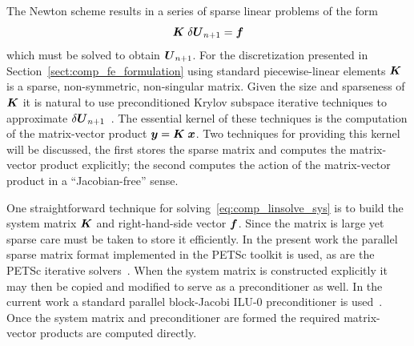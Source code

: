 The Newton scheme results in a series of sparse linear problems of the form
\begin{equation}
  {\boldsymbol{K}}\;\delta{\boldsymbol{U}}_{n+1}={\boldsymbol{f}}
  \label{eq:comp_linsolve_sys}
\end{equation}
which must be solved to obtain ${\boldsymbol{U}}_{n+1}$.  For the discretization presented in Section~\ref{sect:comp_fe_formulation} using standard piecewise-linear elements ${\boldsymbol{K}}$ is a sparse, non-symmetric, non-singular matrix.  Given the size and sparseness of ${\boldsymbol{K}}$ it is natural to use preconditioned Krylov subspace iterative techniques to approximate $\delta{\boldsymbol{U}}_{n+1}$~\cite{barrett94templates,golub_van_loan}.  The essential kernel of these techniques is the computation of the matrix-vector product ${\boldsymbol{y}}={\boldsymbol{K}}\;{\boldsymbol{x}}$.  Two techniques for providing this kernel will be discussed, the first stores the sparse matrix and computes the matrix-vector product explicitly; the second computes the action of the matrix-vector product in a ``Jacobian-free'' sense.

One straightforward technique for solving~\eqref{eq:comp_linsolve_sys} is to build the system matrix ${\boldsymbol{K}}$ and right-hand-side vector ${\boldsymbol{f}}$.  Since the matrix is large yet sparse care must be taken to store it efficiently.  In the present work the parallel sparse matrix format implemented in the PETSc toolkit is used, as are the PETSc iterative solvers~\cite{petsc_manual}.  When the system matrix is constructed explicitly it may then be copied and modified to serve as a preconditioner as well.  In the current work a standard parallel block-Jacobi ILU-0 preconditioner is used~\cite{barrett94templates,golub_van_loan}.  Once the system matrix and preconditioner are formed the required matrix-vector products are computed directly.

